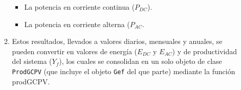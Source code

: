 \begin{enumerate}
\begin{enumerate}
\begin{itemize}
\item La potencia en corriente continua (\(P_{DC}\)).
\item La potencia en corriente alterna (\(P_{AC}\).
\end{itemize}
\item Estos resultados, llevados a valores diarios, mensuales y anuales, se pueden convertir en valores de energía (\(E_{DC}\) y \(E_{AC}\)) y de productividad del sistema (\(Y_f\)), los cuales se consolidan en un solo objeto de clase \texttt{ProdGCPV} (que incluye el objeto \texttt{Gef} del que parte) mediante la función prodGCPV.
\end{enumerate}
\end{enumerate}
